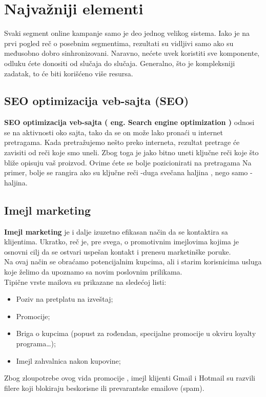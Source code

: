 \documentclass[a4paper]{article}
\begin{document}
{\section{Najvažniji elementi}
\label{sec:najvažniji elementi}
Svaki segment online kampanje samo je deo jednog velikog sistema. Iako je na prvi pogled reč o posebnim segmentima, rezultati su vidljivi samo ako su međusobno dobro sinhronizovani. Naravno, nećete uvek koristiti sve komponente, odluku ćete donositi od slučaja do slučaja. Generalno, što je kompleksniji zadatak, to će biti korišćeno više resursa.
\subsection{SEO optimizacija veb-sajta (SEO)}
\label{subsec:SEO}
\textbf {SEO optimizacija veb-sajta  ( eng. Search engine optimization )} odnosi se na aktivnosti oko sajta, tako da se on može lako pronaći u internet pretragama. Kada pretražujemo nešto preko interneta, rezultat pretrage će zavisiti od reči koje smo uneli. Zbog toga je jako bitno uneti ključne reči koje što bliže opisuju vaš proizvod. Ovime ćete se bolje pozicionirati na pretragama
Na primer, bolje se rangira ako su ključne reči -duga svečana haljina  , nego samo -haljina.
\subsection{Imejl marketing}
\label{subsec:Imejl}
 \textbf{Imejl marketing} je i dalje izuzetno efikasan način da se kontaktira sa klijentima. Ukratko, reč je, pre svega, o promotivnim imejlovima kojima je osnovni cilj da se ostvari uspešan kontakt i prenesu marketinške poruke.
\\Na ovaj način se obraćamo potencijalnim kupcima, ali i starim korisnicima usluga koje želimo da upoznamo sa novim poslovnim prilikama.
\\Tipične vrste mailova su prikazane na sledećoj listi: 
\begin{itemize}
    \item Poziv na pretplatu na izveštaj;
    \item Promocije;
    \item Briga o kupcima (popust za rođendan, specijalne promocije u okviru loyalty programa…);
    \item Imejl zahvalnica nakon kupovine;
    \label{item:email}
\end{itemize}
Zbog zloupotrebe ovog vida promocije , imejl klijenti  Gmail i Hotmail su razvili filere koji  blokiraju beskorisne ili prevarantske emailove (spam).
}
\end{document}
